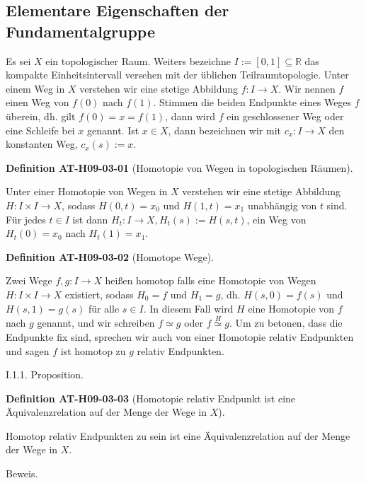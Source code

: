 \documentclass[10pt, letterpaper]{article}
\newcommand{\CustomHeading}[3]{%
  \par\medskip\noindent%
  \textbf{#1 #2} \textnormal{(#3)}.\enskip%
}
\newenvironment{DEF}[2]{\begin{unitbox}\CustomHeading{Definition}{#1}{#2}}{\end{unitbox}}
\begin{document}
\pagebreak


\subsection{Elementare Eigenschaften der Fundamentalgruppe}

Es sei $X$ ein topologischer Raum. Weiters bezeichne $I:=[0,1] \subseteq \mathbb{R}$ das kompakte Einheitsintervall versehen mit der üblichen Teilraumtopologie. Unter einem Weg in $X$ verstehen wir eine stetige Abbildung $f: I \rightarrow X$. Wir nennen $f$ einen Weg von $f(0)$ nach $f(1)$. Stimmen die beiden Endpunkte eines Weges $f$ überein, dh. gilt $f(0)=x=f(1)$, dann wird $f$ ein geschlossener Weg oder eine Schleife bei $x$ genannt. Ist $x \in X$, dann bezeichnen wir mit $c_{x}: I \rightarrow X$ den konstanten Weg, $c_{x}(s):=x$.


\begin{DEF}{AT-H09-03-01}{Homotopie von Wegen in topologischen Räumen}
Unter einer Homotopie von Wegen in $X$ verstehen wir eine stetige Abbildung $H: I \times I \rightarrow X$, sodass $H(0, t)=x_{0}$ und $H(1, t)=x_{1}$ unabhängig von $t$ sind. Für jedes $t \in I$ ist dann $H_{t}: I \rightarrow X, H_{t}(s):=H(s, t)$, ein Weg von $H_{t}(0)=x_{0}$ nach $H_{t}(1)=x_{1}$.
\end{DEF}

\begin{DEF}{AT-H09-03-02}{Homotope Wege}
Zwei Wege $f, g: I \rightarrow X$ heißen homotop falls eine Homotopie von Wegen $H: I \times I \rightarrow X$ existiert, sodass $H_{0}=f$ und $H_{1}=g$, dh. $H(s, 0)=f(s)$ und $H(s, 1)=g(s)$ für alle $s \in I$. In diesem Fall wird $H$ eine Homotopie von $f$ nach $g$ genannt, und wir schreiben $f \simeq g$ oder $f \stackrel{H}{\simeq} g$. Um zu betonen, dass die Endpunkte fix sind, sprechen wir auch von einer Homotopie relativ Endpunkten und sagen $f$ ist homotop zu $g$ relativ Endpunkten.
\end{DEF}


I.1.1. Proposition. 

\begin{DEF}{AT-H09-03-03}{Homotopie relativ Endpunkt ist eine Äquivalenzrelation auf der Menge der Wege in $X$}
Homotop relativ Endpunkten zu sein ist eine Äquivalenzrelation auf der Menge der Wege in $X$.
\end{DEF}

Beweis. 
\end{document}

